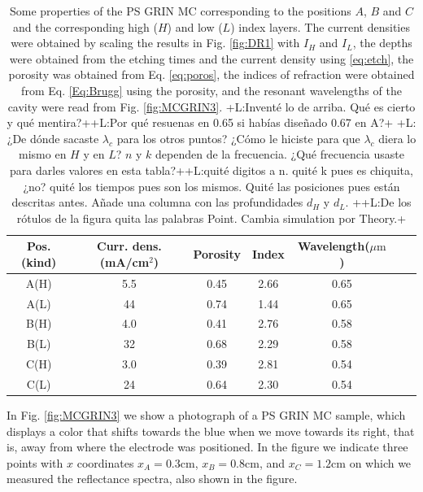 \documentclass{article}
\newcommand{\notaL}[1]{{\color{blue}+L:#1+}}
\begin{document}
\begin{table}
  \centering
  \begin{tabular}{ccccccc}
    \hline
    Pos.(kind)&Curr. dens.(mA/cm$^2$)&Porosity&Index&Wavelength($\mu\text{m}$)\\
    \hline
    \hline
    A(H) & 5.5 & 0.45& 2.66& 0.65   \\
    A(L) & 44  & 0.74& 1.44& 0.65   \\
    B(H) & 4.0 & 0.41& 2.76& 0.58   \\
    B(L) & 32  & 0.68& 2.29& 0.58   \\
    C(H) & 3.0 & 0.39& 2.81&0.54    \\
    C(L) & 24  & 0.64& 2.30&0.54    \\
  \end{tabular}
  \caption{Some properties of the PS GRIN MC corresponding to the
    positions $A$, $B$ and $C$ and the corresponding high ($H$) and
    low ($L$) index layers. The current densities were obtained by
    scaling the results in Fig. \ref{fig:DR1} with $I_H$ and
    $I_L$, the depths were obtained from the etching
    times and the current density using \eqref{eq:etch}, the porosity
    was obtained from Eq. \eqref{eq:poros}, the indices of refraction
    were obtained from Eq. \eqref{Eq:Brugg} using the porosity, and
    the resonant wavelengths of the cavity were read from
    Fig. \ref{fig:MCGRIN3}.
    \notaL{Inventé lo de arriba. Qué es cierto y qué
      mentira?}\notaL{Por qué resuenas en 0.65 si habías diseñado
      0.67 en A?} \notaL{¿De dónde sacaste
        $\lambda_c$ para los otros puntos? ¿Cómo le hiciste para que
        $\lambda_c$ diera lo mismo en $H$ y en $L$? $n$ y $k$ dependen de la
        frecuencia. ¿Qué frecuencia usaste para darles valores en esta
        tabla?}\notaL{quité digitos a n. quité k pues es chiquita,
        ¿no? quité los tiempos pues son los mismos. Quité las
        posiciones pues están descritas antes. Añade una columna
        con las profundidades $d_H$ y $d_L$. }\notaL{De los rótulos de
      la figura quita las palabras Point. Cambia simulation por Theory.}}
	\label{tabla:1}
\end{table}
In Fig. \ref{fig:MCGRIN3} we show a photograph of a PS GRIN MC
sample, which displays a color that shifts towards the blue when we
move towards its right, that is, away from where the electrode was
positioned. In the figure we indicate three points with $x$ coordinates
$x_A=0.3\text{cm}$,  $x_B=0.8\text{cm}$, and $x_C=1.2\text{cm}$
on which we measured the reflectance spectra, also shown in the figure.
\end{document}
